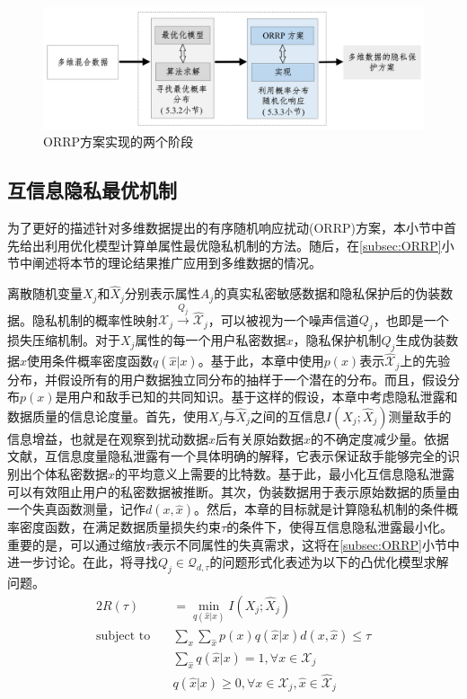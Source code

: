 \begin{figure}[htbp]
	\centering
	\includegraphics[width = 0.99\linewidth]{./figures/chapter06/chapter06_2.jpg}
	\caption{ORRP方案实现的两个阶段}
	\label{fig:chapter06_Fig02}
\end{figure}

\subsection{互信息隐私最优机制}\label{subsec:MI_optimal_mechanism}

为了更好的描述针对多维数据提出的有序随机响应扰动(ORRP)方案，本小节中首先给出利用优化模型计算单属性最优隐私机制的方法。随后，在\ref{subsec:ORRP}小节中阐述将本节的理论结果推广应用到多维数据的情况。


离散随机变量$X_j$和$\hat{X}_j$分别表示属性$A_j$的真实私密敏感数据和隐私保护后的伪装数据。隐私机制的概率性映射$\mathcal{X}_j \xrightarrow{Q_j} \hat{\mathcal{X}}_j$，可以被视为一个噪声信道$Q_j$，也即是一个损失压缩机制。对于$X_j$属性的每一个用户私密数据$x$，隐私保护机制$Q_j$生成伪装数据$\hat{x}$使用条件概率密度函数$q(\hat{x}|x)$。基于此，本章中使用$p(x)$表示$\hat{\mathcal{X}}_j$上的先验分布，并假设所有的用户数据独立同分布的抽样于一个潜在的分布。而且，假设分布$p(x)$是用户和敌手已知的共同知识。基于这样的假设，本章中考虑隐私泄露和数据质量的信息论度量。首先，使用$X_j$与$\hat{X}_j$之间的互信息$I(X_j;\hat{X}_j)$测量敌手的信息增益，也就是在观察到扰动数据$\hat{x}$后有关原始数据$x$的不确定度减少量。依据文献，互信息度量隐私泄露有一个具体明确的解释，它表示保证敌手能够完全的识别出个体私密数据$x$的平均意义上需要的比特数。基于此，最小化互信息隐私泄露可以有效阻止用户的私密数据被推断。其次，伪装数据用于表示原始数据的质量由一个失真函数测量，记作$d(x,\hat{x})$。然后，本章的目标就是计算隐私机制的条件概率密度函数，在满足数据质量损失约束$\tau$的条件下，使得互信息隐私泄露最小化。重要的是，可以通过缩放$\tau$表示不同属性的失真需求，这将在\ref{subsec:ORRP}小节中进一步讨论。在此，将寻找$Q_j \in \mathcal{Q}_{d,\tau}$的问题形式化表述为以下的凸优化模型求解问题。
\begin{alignat}{2}
  R(\tau)  & =\min_{q(\hat{x}|x)} I(X_j;\hat{X}_j) \label{min:lp1}  \nonumber\\
   \mbox{subject to} \quad
   & \sum_{x}\sum_{\hat{x}}p(x)q(\hat{x}|x)d(x,\hat{x})\leq\tau \\
   & \sum_{\hat{x}} q(\hat{x}|x)=1,\forall x\in \mathcal{X}_j \\
   & q(\hat{x}|x)\geq 0,\forall x \in \mathcal{X}_j,\hat{x}\in \hat{\mathcal{X}}_j
   \end{alignat}

